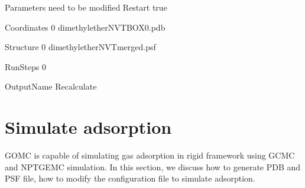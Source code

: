 \documentclass[letterpaper,10pt,english]{sphinxmanual}
\begin{document}
\begin{sphinxVerbatim}[commandchars=\\\{\}]
\PYGZsh{}\PYGZsh{}\PYGZsh{}\PYGZsh{}\PYGZsh{}\PYGZsh{}\PYGZsh{}\PYGZsh{}\PYGZsh{}\PYGZsh{}\PYGZsh{}\PYGZsh{}\PYGZsh{}\PYGZsh{}\PYGZsh{}\PYGZsh{}\PYGZsh{}\PYGZsh{}\PYGZsh{}\PYGZsh{}\PYGZsh{}\PYGZsh{}\PYGZsh{}\PYGZsh{}\PYGZsh{}\PYGZsh{}\PYGZsh{}\PYGZsh{}\PYGZsh{}\PYGZsh{}\PYGZsh{}\PYGZsh{}\PYGZsh{}\PYGZsh{}\PYGZsh{}\PYGZsh{}\PYGZsh{}\PYGZsh{}\PYGZsh{}\PYGZsh{}\PYGZsh{}\PYGZsh{}\PYGZsh{}\PYGZsh{}\PYGZsh{}\PYGZsh{}\PYGZsh{}\PYGZsh{}\PYGZsh{}\PYGZsh{}\PYGZsh{}\PYGZsh{}\PYGZsh{}\PYGZsh{}\PYGZsh{}\PYGZsh{}
\PYGZsh{} Parameters need to be modified
\PYGZsh{}\PYGZsh{}\PYGZsh{}\PYGZsh{}\PYGZsh{}\PYGZsh{}\PYGZsh{}\PYGZsh{}\PYGZsh{}\PYGZsh{}\PYGZsh{}\PYGZsh{}\PYGZsh{}\PYGZsh{}\PYGZsh{}\PYGZsh{}\PYGZsh{}\PYGZsh{}\PYGZsh{}\PYGZsh{}\PYGZsh{}\PYGZsh{}\PYGZsh{}\PYGZsh{}\PYGZsh{}\PYGZsh{}\PYGZsh{}\PYGZsh{}\PYGZsh{}\PYGZsh{}\PYGZsh{}\PYGZsh{}\PYGZsh{}\PYGZsh{}\PYGZsh{}\PYGZsh{}\PYGZsh{}\PYGZsh{}\PYGZsh{}\PYGZsh{}\PYGZsh{}\PYGZsh{}\PYGZsh{}\PYGZsh{}\PYGZsh{}\PYGZsh{}\PYGZsh{}\PYGZsh{}\PYGZsh{}\PYGZsh{}\PYGZsh{}\PYGZsh{}\PYGZsh{}\PYGZsh{}\PYGZsh{}\PYGZsh{}
Restart         true

Coordinates     0   dimethylether\PYGZus{}NVT\PYGZus{}BOX\PYGZus{}0.pdb

Structure       0   dimethylether\PYGZus{}NVT\PYGZus{}merged.psf

RunSteps        0

OutputName          Recalculate
\end{sphinxVerbatim}


\section{Simulate adsorption}
\label{\detokenize{howto:simulate-adsorption}}
GOMC is capable of simulating gas adsorption in rigid framework using GCMC and NPT\sphinxhyphen{}GEMC simulation. In this section, we discuss how to generate PDB and PSF file,
how to modify the configuration file to simulate adsorption.
\end{document}
